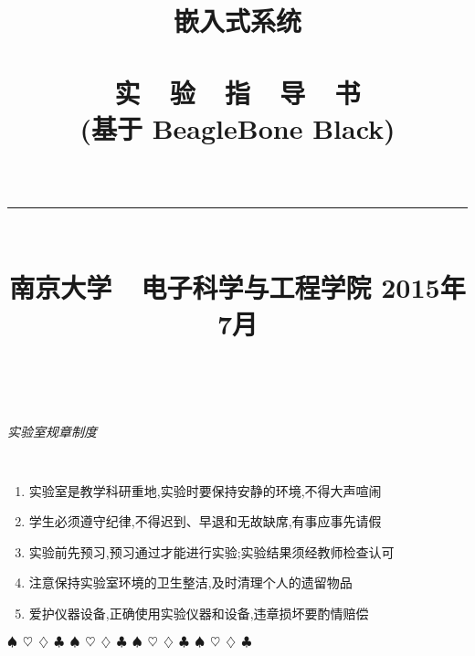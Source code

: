 \documentclass[a4paper,11pt]{book}
\title{
\begin{flushright}
\bf 嵌入式系统 \\ \ \\
 \textsf{实\ \ 验\ \ 指\ \ 导\ \ 书\\
(基于 BeagleBone Black)} \\ \ \\
\rule[10pt]{.6\textwidth}{2pt}\\
\large \textsf{南京大学~~电子科学与工程学院}
\vskip 4cm 2015年7月
\end{flushright}
}
\author{}
\date{}
\begin{document}
\maketitle

\thispagestyle{empty} ~ \vskip 2cm
\begin{center} \LARGE \it \textsf{实验室规章制度} \end{center}
\large \tt
\begin{enumerate}\itemsep=-5pt
  \item 实验室是教学科研重地,实验时要保持安静的环境,不得大声喧闹
  \item 学生必须遵守纪律,不得迟到、早退和无故缺席,有事应事先请假
  \item 实验前先预习,预习通过才能进行实验;实验结果须经教师检查认可
  \item 注意保持实验室环境的卫生整洁,及时清理个人的遗留物品
  \item 爱护仪器设备,正确使用实验仪器和设备,违章损坏要酌情赔偿
\end{enumerate}

\vspace{4mm}\begin{center}
$\spadesuit~~ \heartsuit~~ \diamondsuit~~ \clubsuit~~
\spadesuit~~ \heartsuit~~ \diamondsuit~~ \clubsuit~~
\spadesuit~~ \heartsuit~~ \diamondsuit~~ \clubsuit~~
\spadesuit~~ \heartsuit~~ \diamondsuit~~ \clubsuit~~$
\end{center}\vspace{4mm}


\frontmatter
{}
\setlength{\parindent}{2em}
\setlength\doublerulesep{.2pt}

\baselineskip=17pt
\tableofcontents

\mainmatter
\pagestyle{headings}
\setcounter{page}{1}












\end{document}
